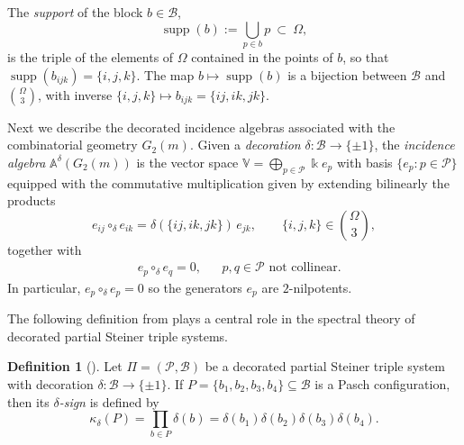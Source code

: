 \documentclass[times,11pt,reqno]{amsproc}
\theoremstyle{definition}
\newtheorem{definition}[theorem]{Definition}
\numberwithin{equation}{section}
\newcommand\fie{\Bbbk}
\def\alg{\mathbb{A}}
\def\valg{\mathbb{V}}
\DeclareMathOperator{\supp}{supp}
\begin{document}
The \emph{support} of the block $b\in\mathcal B$,
\begin{equation}\label{eq:suppdef}
\supp(b):=\bigcup_{p\in b}p\ \subset\ \Omega,
\end{equation}
is the triple of the elements of $\Omega$ contained in the points of $b$, so that $\supp(b_{ijk}) = \{i,j,k\}$. The map $b\mapsto\supp(b)$ is a bijection between $\mathcal B$ and $\binom{\Omega}{3}$, with inverse $\{i,j,k\}\mapsto b_{ijk} = \{ij,ik,jk\}$.







Next we describe the decorated incidence algebras associated with the combinatorial geometry $G_2(m)$. Given a \textit{decoration} $\delta:\mathcal B\to\{\pm1\}$,
the \textit{incidence algebra} $\alg^\delta(G_2(m))$ is the vector space
$\valg=\bigoplus_{p\in\mathcal P}\fie e_p$ with basis
$\{e_p:p\in\mathcal P\}$ equipped with the commutative multiplication given by extending bilinearly the products
\begin{equation}\label{multiplication}
e_{ij}\circ_\delta e_{ik}
=
\delta(\{ij,ik,jk\})\,e_{jk},
\qquad
\{i,j,k\}\in\binom{\Omega}{3},
\end{equation}
together with
\begin{align}\label{multiplication2}
&e_p\circ_\delta e_q=0,& &p, q \in \mathcal P \text{ not collinear.}
\end{align}
In particular, $e_p\circ_\delta e_p = 0$ so the generators $e_p$ are $2$-nilpotents.





The following definition from \cite{Fox-Tka2026b} plays a central role in the spectral theory of decorated partial Steiner triple systems.

\begin{definition}[\cite{Fox-Tka2026b}]\label{def:paschsign}
Let $\Pi=(\mathcal P,\mathcal B)$ be a decorated partial Steiner triple system with decoration
$\delta:\mathcal B\to\{\pm1\}.$
If $P=\{b_1,b_2,b_3,b_4\}\subseteq\mathcal B$
is a Pasch configuration, then its \emph{$\delta$-sign} is defined by
\begin{equation}\label{kappaP}
\kappa_\delta(P)
=
\prod_{b\in P}\delta(b)
=
\delta(b_1)\delta(b_2)\delta(b_3)\delta(b_4).
\end{equation}
\end{definition}
\end{document}
